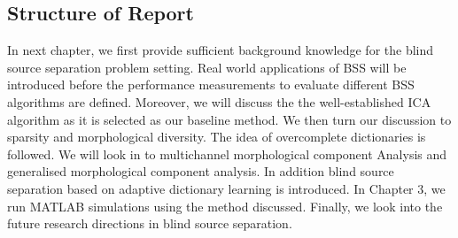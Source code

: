 \subsection{Structure of Report}
In next chapter, we first provide sufficient background knowledge for the blind source separation problem setting. Real world applications of BSS will be introduced before the performance measurements to evaluate different BSS algorithms are defined. Moreover, we will discuss the the well-established ICA algorithm as it is selected as our baseline method. We then turn our discussion to sparsity and morphological diversity. The idea of overcomplete dictionaries is followed. We will look in to multichannel morphological component Analysis and generalised morphological component analysis. In addition blind source separation based on adaptive dictionary learning is introduced. In Chapter 3, we run MATLAB simulations using the method discussed. Finally, we look into the future research directions in blind source separation.
